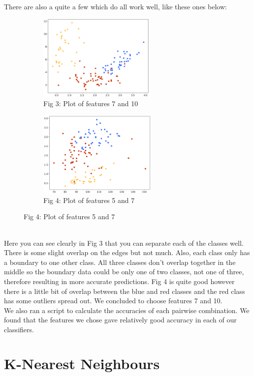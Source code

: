 \documentclass[11pt]{article}
\begin{document}
\noindent
There are also a quite a few which do all work well, like these ones below:

\begin{figure}[h!]
\captionsetup[subfigure]{labelformat=empty}
\begin{subfigure}{.5\textwidth}
\centering
\includegraphics[height=4.2cm]{7and10.png}
\caption{Fig 3: Plot of features 7 and 10}
\end{subfigure}%
\begin{subfigure}{.5\textwidth}
\centering
\includegraphics[height=4.2cm]{5and7.png}
\caption{Fig 4: Plot of features 5 and 7}
\end{subfigure}%
\end{figure}
\noindent
\\
\noindent
Here you can see clearly in Fig 3 that you can separate each of the classes well. There is some slight overlap on the edges but not much. Also, each class only has a boundary to one other class. All three classes don’t overlap together in the middle so the boundary data could be only one of two classes, not one of three, therefore resulting in more accurate predictions. Fig 4 is quite good however there is a little bit of overlap between the blue and red classes and the red class has some outliers spread out. We concluded to choose features 7 and 10.\\

\noindent
We also ran a script to calculate the accuracies of each pairwise combination. We found that the features we chose gave relatively good accuracy in each of our classifiers.

\section*{K-Nearest Neighbours}
\end{document}
